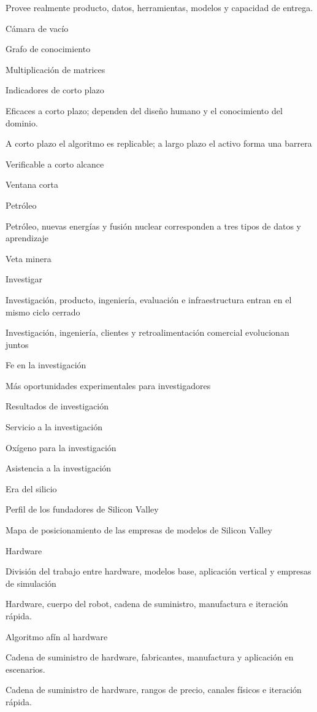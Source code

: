 \documentclass{article}
\begin{document}
Provee realmente producto, datos, herramientas, modelos y capacidad de entrega.

Cámara de vacío

Grafo de conocimiento

Multiplicación de matrices

Indicadores de corto plazo

Eficaces a corto plazo; dependen del diseño humano y el conocimiento del dominio.

A corto plazo el algoritmo es replicable; a largo plazo el activo forma una barrera

Verificable a corto alcance

Ventana corta

Petróleo

Petróleo, nuevas energías y fusión nuclear corresponden a tres tipos de datos y aprendizaje

Veta minera

Investigar

Investigación, producto, ingeniería, evaluación e infraestructura entran en el mismo ciclo cerrado

Investigación, ingeniería, clientes y retroalimentación comercial evolucionan juntos

Fe en la investigación

Más oportunidades experimentales para investigadores

Resultados de investigación

Servicio a la investigación

Oxígeno para la investigación

Asistencia a la investigación

Era del silicio

Perfil de los fundadores de Silicon Valley

Mapa de posicionamiento de las empresas de modelos de Silicon Valley

Hardware

División del trabajo entre hardware, modelos base, aplicación vertical y empresas de simulación

Hardware, cuerpo del robot, cadena de suministro, manufactura e iteración rápida.

Algoritmo afín al hardware

Cadena de suministro de hardware, fabricantes, manufactura y aplicación en escenarios.

Cadena de suministro de hardware, rangos de precio, canales físicos e iteración rápida.
\end{document}
